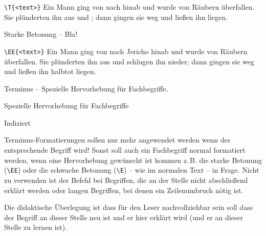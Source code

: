 \documentclass[
ngerman,
paper=a4,
asymmetric,
fontsize=10pt,
draft=false,
numbers=noenddot,
bibtotocnumbered,
footnotes=multiple,
toc=flat,
]{scrbook}
\newenvironment{Beispiel}
{\begin{tcolorbox}[title=Beispiel]

}{\end{tcolorbox}}
\begin{document}
\begin{Beispiel}\lstinline$\T{<text>}$\tcblower
Ein Mann ging von  nach  hinab und wurde von Räubern
überfallen. Sie plünderten ihn aus und ; dann gingen sie
weg und ließen ihn  liegen.
\end{Beispiel}




\Text
{Starke Betonung -- }
{Bla!}
{}
{}
{}
{}



\begin{Beispiel}
\lstinline$\EE{<text>}$
\tcblower
Ein Mann ging von  nach Jericho hinab und wurde von Räubern
überfallen. Sie plünderten ihn aus und schlugen ihn nieder; dann gingen sie weg und ließen
ihn halbtot liegen.
\end{Beispiel}



\TextSlide
{Terminus -- }
{Spezielle Hervorhebung für Fachbegriffe.}
{Spezielle Hervorhebung für Fachbegriffe

Indiziert}
{}
{}
{}
Terminus-Formatierungen sollen nur mehr angewendet werden
  wenn der entsprechende Begriff  wird! Sonst soll auch ein Fachbegriff
  normal formatiert werden, wenn eine Hervorhebung gewünscht
  ist kommen z.\,B. die starke Betonung (\lstinline$\EE$)
  oder die schwache Betonung (\lstinline$\E$) -- wie im
  normalen Text -- in Frage.
Nicht zu verwenden ist der Befehl bei Begriffen, die an der
Stelle nicht abschließend erklärt werden oder langen
Begriffen, bei denen ein Zeilenumbruch nötig ist.

Die didaktische Überlegung ist dass für den Leser
  nachvollziehbar sein soll dass der Begriff an dieser Stelle neu ist und er
  hier erklärt wird (und er an dieser Stelle zu lernen ist).

\end{document}
